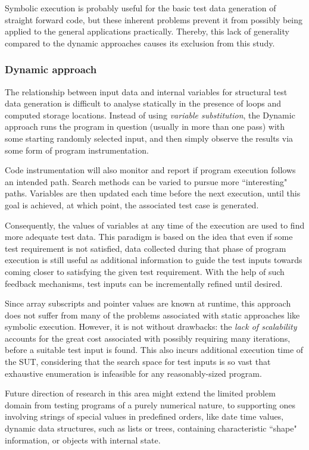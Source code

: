 \documentclass{icldt}
\numberwithin{equation}{section}       %
\begin{document}
Symbolic execution is probably useful for the basic test data generation of straight forward code, but these inherent problems prevent it from possibly being applied to the general applications practically. Thereby, this lack of generality compared to the dynamic approaches causes its exclusion from this study.

	\subsubsection{Dynamic approach}
The relationship between input data and internal variables for structural test data generation is difficult to analyse statically in the presence of loops and computed storage locations. Instead of using \emph{variable substitution}, the Dynamic approach runs the program in question (usually in more than one pass) with some starting randomly selected input, and then simply observe the results via some form of program instrumentation.

Code instrumentation will also monitor and report if program execution follows an intended path. Search methods can be varied to pursue more ``interesting" paths. Variables are then updated each time before the next execution, until this goal is achieved, at which point, the associated test case is generated.

Consequently, the values of variables at any time of the execution are used to find more adequate test data. This paradigm is based on the idea that even if some test requirement is not satisfied, data collected during that phase of program execution is still useful as additional information to guide the test inputs towards coming closer to satisfying the given test requirement. With the help of such feedback mechanisms, test inputs can be incrementally refined until desired.

Since array subscripts and pointer values are known at runtime, this approach does not suffer from many of the problems associated with static approaches like symbolic execution. However, it is not without drawbacks: the \emph{lack of scalability} accounts for the great cost associated with possibly requiring many iterations, before a suitable test input is found. This also incurs additional execution time of the SUT, considering that the search space for test inputs is so vast that exhaustive enumeration is infeasible for any reasonably-sized program.

Future direction of research in this area might extend the limited problem domain from testing programs of a purely numerical nature, to supporting ones involving strings of special values in predefined orders, like date time values, dynamic data structures, such as lists or trees, containing characteristic ``shape" information, or objects with internal state.
\end{document}
